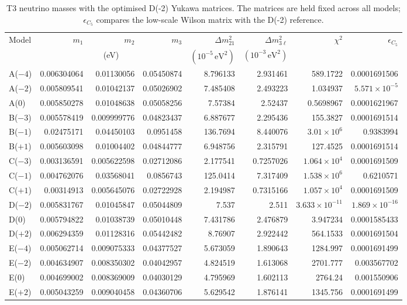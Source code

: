 \begin{table}[p]
\centering
\caption{T3 neutrino masses with the optimised D(-2) Yukawa matrices. The matrices are held fixed across all models; $\epsilon_{C_5}$ compares the low-scale Wilson matrix with the D(-2) reference.}
\label{tab:appC_Dm2_masses}
\begingroup
\footnotesize
\setlength{\tabcolsep}{3.2pt}
\begin{tabular}{lrrrrrrr}
\hline
Model & $m_1$ & $m_2$ & $m_3$ & $\Delta m^2_{21}$ & $\Delta m^2_{3\ell}$ & $\chi^2$ & $\epsilon_{C_5}$ \\
 & \multicolumn{3}{c}{(eV)} & $(10^{-5}\,\mathrm{eV}^2)$ & $(10^{-3}\,\mathrm{eV}^2)$ &  &  \\
\hline
A($-4$) & 0.006304064 & 0.01130056 & 0.05450874 & 8.796133 & 2.931461 & 589.1722 & 0.0001691506 \\
A($-2$) & 0.005809541 & 0.01042137 & 0.05026902 & 7.485408 & 2.493223 & 1.034937 & $5.571\times10^{-5}$ \\
A($0$) & 0.005850278 & 0.01048638 & 0.05058256 & 7.57384 & 2.52437 & 0.5698967 & 0.0001621967 \\
B($-3$) & 0.005578419 & 0.009999776 & 0.04823437 & 6.887677 & 2.295436 & 155.3827 & 0.0001691514 \\
B($-1$) & 0.02475171 & 0.04450103 & 0.0951458 & 136.7694 & 8.440076 & $3.01\times10^{6}$ & 0.9383994 \\
B($+1$) & 0.005603098 & 0.01004402 & 0.04844777 & 6.948756 & 2.315791 & 127.4525 & 0.0001691514 \\
C($-3$) & 0.003136591 & 0.005622598 & 0.02712086 & 2.177541 & 0.7257026 & $1.064\times10^{4}$ & 0.0001691509 \\
C($-1$) & 0.004762076 & 0.03568041 & 0.0856743 & 125.0414 & 7.317409 & $1.538\times10^{6}$ & 0.6210571 \\
C($+1$) & 0.00314913 & 0.005645076 & 0.02722928 & 2.194987 & 0.7315166 & $1.057\times10^{4}$ & 0.0001691509 \\
D($-2$) & 0.005831767 & 0.01045847 & 0.05044809 & 7.537 & 2.511 & $3.633\times10^{-11}$ & $1.869\times10^{-16}$ \\
D($0$) & 0.005794822 & 0.01038739 & 0.05010448 & 7.431786 & 2.476879 & 3.947234 & 0.0001585433 \\
D($+2$) & 0.006294359 & 0.01128316 & 0.05442482 & 8.76907 & 2.922442 & 564.1533 & 0.0001691504 \\
E($-4$) & 0.005062714 & 0.009075333 & 0.04377527 & 5.673059 & 1.890643 & 1284.997 & 0.0001691499 \\
E($-2$) & 0.004634907 & 0.008350302 & 0.04042957 & 4.824519 & 1.613068 & 2701.777 & 0.003567702 \\
E($0$) & 0.004699002 & 0.008369009 & 0.04030129 & 4.795969 & 1.602113 & 2764.24 & 0.001550906 \\
E($+2$) & 0.005043259 & 0.009040458 & 0.04360706 & 5.629542 & 1.876141 & 1345.756 & 0.0001691499 \\
\hline
\end{tabular}
\endgroup
\end{table}
